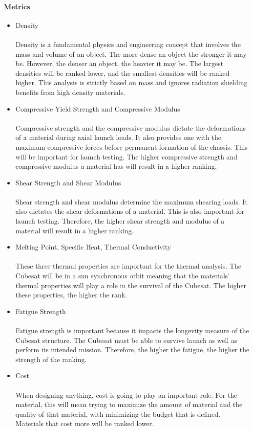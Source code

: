 \paragraph{Metrics}
\begin{itemize}
\item{Density}\\
\\
Density is a fundamental physics and engineering concept that involves the mass and volume of an object. The more dense an object the stronger it may be. However, the denser an object, the heavier it may be. The largest densities will be ranked lower, and the smallest densities will be ranked higher. This analysis is strictly based on mass and ignores radiation shielding benefits from high density materials.
\\
\item{Compressive Yield Strength and Compressive Modulus}\\
\\
Compressive strength and the compressive modulus dictate the deformations of a material during axial launch loads. It also provides one with the maximum compressive forces before permanent formation of the chassis. This will be important for launch testing. The higher compressive strength and compressive modulus a material has will result in a higher ranking.
\\
\item{Shear Strength and Shear Modulus}\\
\\
Shear strength and shear modulus determine the maximum shearing loads. It also dictates the shear deformations of a material. This is also important for launch testing. Therefore, the higher shear strength and modulus of a material will result in a higher ranking. 
\\
\item{Melting Point, Specific Heat, Thermal Conductivity}\\
\\
These three thermal properties are important for the thermal analysis. The Cubesat will be in a sun synchronous orbit meaning that the materials' thermal properties will play a role in the survival of the Cubesat. The higher these properties, the higher the rank. 
\\
\item{Fatigue Strength}\\
\\
Fatigue strength is important because it impacts the longevity measure of the Cubesat structure. The Cubesat must be able to survive launch as well as perform its intended mission. Therefore, the higher the fatigue, the higher the strength of the ranking. 
\\
\item{Cost}\\
\\
When designing anything, cost is going to play an important role. For the material, this will mean trying to maximize the amount of material and the quality of that material, with minimizing the budget that is defined. Materials that cost more will be ranked lower. 
\\
\end{itemize}

